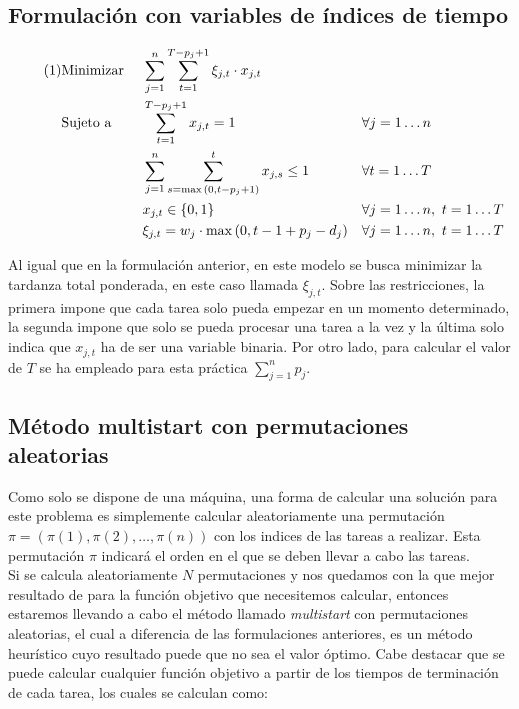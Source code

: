 \documentclass[a4paper,11pt]{article}
\newcommand\numberthis{							%
	\addtocounter{equation}{1}\tag{\theequation}
}
\begin{document}
\subsection{Formulación con variables de índices de tiempo}
\begin{align*}\numberthis
	\label{eq:formulacion_indices}
   	&\textrm{Minimizar }	&& \sum_{j=1}^{n}{\sum_{t=1}^{T-p_{j}+1}{\xi_{j,t} \cdot x_{j,t}}}	&& \\
   	&\textrm{Sujeto a }		&& \sum_{t=1}^{T-p_{j}+1}{x_{j,t} = 1}								&& \forall j = 1 \ldots n \\
    &						&& \sum_{j=1}^{n}{\sum_{s=\max{(0,t-p_{j}+1)}}^{t}{x_{j,s} \leq 1}}	&& \forall t = 1 \ldots T \\
    &						&& x_{j,t} \in \{0,1\}												&& \forall j = 1 \ldots n, \ t = 1 \ldots T \\
    &						&& \xi_{j,t} = w_{j} \cdot \max{(0, t-1+p_{j}-d_{j})}	&& \forall j = 1 \ldots n, \ t = 1 \ldots T \\
\end{align*}

Al igual que en la formulación anterior, en este modelo se busca minimizar 
la tardanza total ponderada, en este caso llamada ${\xi_{j,t}}$. Sobre las restricciones, la primera impone que cada tarea solo pueda empezar en un momento determinado, la segunda impone que solo se pueda procesar una tarea a la vez y la última solo indica que ${x_{j,t}}$ ha de ser una variable binaria. Por otro lado, para calcular el valor de ${T}$ se ha empleado para esta práctica ${\sum_{j=1}^{n}{p_{j}}}$.

\subsection{Método multistart con permutaciones aleatorias}
Como solo se dispone de una máquina, una forma de calcular una solución para este problema es simplemente calcular aleatoriamente una permutación ${\pi = (\pi(1), \pi(2), \ldots, \pi(n))}$ con los indices de las tareas a realizar. Esta permutación ${\pi}$ indicará el orden en el que se deben llevar a cabo las tareas.\\

Si se calcula aleatoriamente ${N}$ permutaciones y nos quedamos con la que mejor resultado de para la función objetivo que necesitemos calcular, entonces estaremos llevando a cabo el método llamado \textit{multistart} con permutaciones aleatorias, el cual a diferencia de las formulaciones anteriores, es un método heurístico cuyo resultado puede que no sea el valor óptimo. Cabe destacar que se puede calcular cualquier función objetivo a partir de los tiempos de terminación de cada tarea, los cuales se calculan como:
\end{document}
